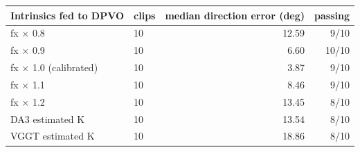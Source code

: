 \begin{tabular}{llrr}
\toprule
Intrinsics fed to DPVO & clips & median direction error (deg) & passing \\
\midrule
fx $\times$ 0.8 & 10 & 12.59 & 9/10 \\
fx $\times$ 0.9 & 10 & 6.60 & 10/10 \\
fx $\times$ 1.0 (calibrated) & 10 & 3.87 & 9/10 \\
fx $\times$ 1.1 & 10 & 8.46 & 9/10 \\
fx $\times$ 1.2 & 10 & 13.45 & 8/10 \\
DA3 estimated K & 10 & 13.54 & 8/10 \\
VGGT estimated K & 10 & 18.86 & 8/10 \\
\bottomrule
\end{tabular}
